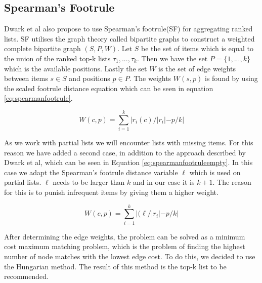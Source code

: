\subsection{Spearman's Footrule}\label{sec:spearmansfootrule}
Dwark et al also propose to use Spearman's footrule(SF) for aggregating ranked lists\citep{rank:aggregation}.
SF utilises the graph theory called bipartite graphs to construct a weighted complete bipartite graph $(S,P,W)$. 
Let $S$ be the set of items which is equal to the union of the ranked top-k lists $\tau_1, ..., \tau_k$. Then we have the set $P = \{1,...,k\}$ which is the available positions. Lastly the set $W$ is the set of edge weights between items $s\in S$ and positions $p\in P$. The weights $W(s,p)$ is found by using the scaled footrule distance equation which can be seen in equation \ref{eq:spearmanfootrule}. 
 


\begin{equation}\label{eq:spearmanfootrule}
W(c,p) = \displaystyle\sum_{i=1}^{k} |r_i(c)/|r_i| - p/k|
\end{equation}

As we work with partial lists we will encounter lists with missing items. For this reason we have added a second case, in addition to the approach described by Dwark et al, which can be seen in Equation \ref{eq:spearmanfootruleempty}. In this case we adapt the Spearman's footrule distance variable $\ell$ which is used on partial lists. $\ell$ needs to be larger than $k$ and in our case it is $k + 1$. The reason for this is to punish infrequent items by giving them a higher weight.

\begin{equation}\label{eq:spearmanfootruleempty}
W(c,p) = \displaystyle\sum_{i=1}^{k} |(\ell/|r_i| - p/k|
\end{equation}

After determining the edge weights, the problem can be solved as a minimum cost maximum matching problem, which is the problem of finding the highest number of node matches with the lowest edge cost. To do this, we decided to use the Hungarian method. The result of this method is the top-k list to be recommended.